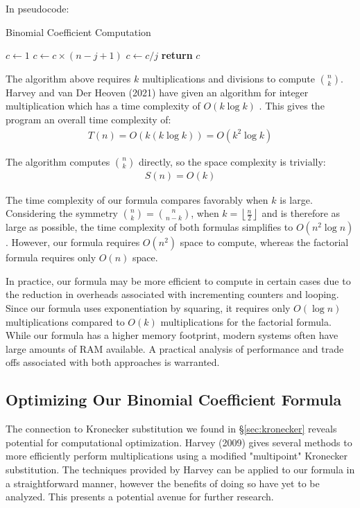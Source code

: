 \documentclass{article}
\theoremstyle{plain}
\theoremstyle{definition}
\begin{document}
In pseudocode:
\begin{algorithm}[H]
\caption{Binomial Coefficient Computation}
\begin{algorithmic}[1]
    \State \( c \leftarrow 1 \)
        \State \( c \leftarrow c \times (n - j + 1) \)
        \State \( c \leftarrow c / j \)
    \EndFor
    \State \textbf{return} \( c \)
\EndFunction
\end{algorithmic}
\end{algorithm}

The algorithm above requires $k$ multiplications and divisions to compute $\binom{n}{k}$. Harvey and van Der Heoven (2021) have given an algorithm for integer multiplication which has a time complexity of $O(k \log{k})$ \cite{harveyvanderhoeven2021}. This gives the program an overall time complexity of:
\begin{align}
    T(n) = O(k (k \log{k})) = O(k^2 \log{k})
\end{align}

The algorithm computes $\binom{n}{k}$ directly, so the space complexity is trivially:
\begin{align}
    S(n) = O(k)
\end{align}

The time complexity of our formula compares favorably when $k$ is large. Considering the symmetry $\binom{n}{k} = \binom{n}{n-k}$, when $k = \left\lfloor \frac{n}{2} \right\rfloor$ and is therefore as large as possible, the time complexity of both formulas simplifies to $O(n^2 \log{n})$. However, our formula requires $O(n^2)$ space to compute, whereas the factorial formula requires only $O(n)$ space.

In practice, our formula may be more efficient to compute in certain cases due to the reduction in overheads associated with incrementing counters and looping. Since our formula uses exponentiation by squaring, it requires only $O(\log{n})$ multiplications compared to $O(k)$ multiplications for the factorial formula. While our formula has a higher memory footprint, modern systems often have large amounts of RAM available. A practical analysis of performance and trade offs associated with both approaches is warranted.

\subsection{Optimizing Our Binomial Coefficient Formula}
The connection to Kronecker substitution we found in \S \ref{sec:kronecker} reveals potential for computational optimization. Harvey (2009) \cite{harvey2009kronecker} gives several methods to more efficiently perform multiplications using a modified "multipoint" Kronecker substitution. The techniques provided by Harvey can be applied to our formula in a straightforward manner, however the benefits of doing so have yet to be analyzed. This presents a potential avenue for further research.
\end{document}
